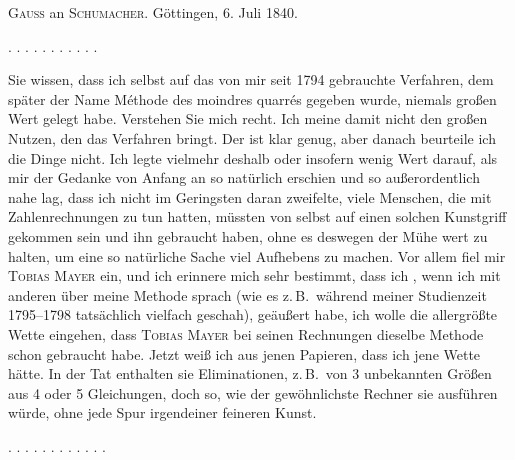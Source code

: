 \clearpage
{}
\begin{center}
\textsc{Gauss} an \textsc{Schumacher}. Göttingen, 6. Juli 1840.
\end{center}

\noindent . . . . . . . . . . .

Sie wissen, dass ich selbst auf das von mir seit 1794 gebrauchte Verfahren, dem später der Name Méthode des moindres quarrés gegeben wurde, niemals großen Wert gelegt habe. Verstehen Sie mich recht. Ich meine damit nicht den großen Nutzen, den das Verfahren bringt. Der ist klar genug, aber danach beurteile ich die Dinge nicht. Ich legte vielmehr deshalb oder insofern wenig Wert darauf, als mir der Gedanke von Anfang an so natürlich erschien und so außerordentlich nahe lag, dass ich nicht im Geringsten daran zweifelte, viele Menschen, die mit Zahlenrechnungen zu tun hatten, müssten von selbst auf einen solchen Kunstgriff gekommen sein und ihn gebraucht haben, ohne es deswegen der Mühe wert zu halten, um eine so natürliche Sache viel Aufhebens zu machen. Vor allem fiel mir \textsc{Tobias Mayer} ein, und ich erinnere mich sehr bestimmt, dass ich , wenn ich mit anderen über meine Methode sprach (wie es z.\,B.\ während meiner Studienzeit 1795--1798 tatsächlich vielfach geschah), geäußert habe, ich wolle die allergrößte Wette eingehen, dass \textsc{Tobias Mayer} bei seinen Rechnungen dieselbe Methode schon gebraucht habe. Jetzt weiß ich aus jenen Papieren, dass ich jene Wette  hätte. In der Tat enthalten sie Eliminationen, z.\,B.\ von 3 unbekannten Größen aus 4 oder 5 Gleichungen, doch so, wie der gewöhnlichste Rechner sie ausführen würde, ohne jede Spur irgendeiner feineren Kunst.

\noindent . . . . . . . . . . . .

